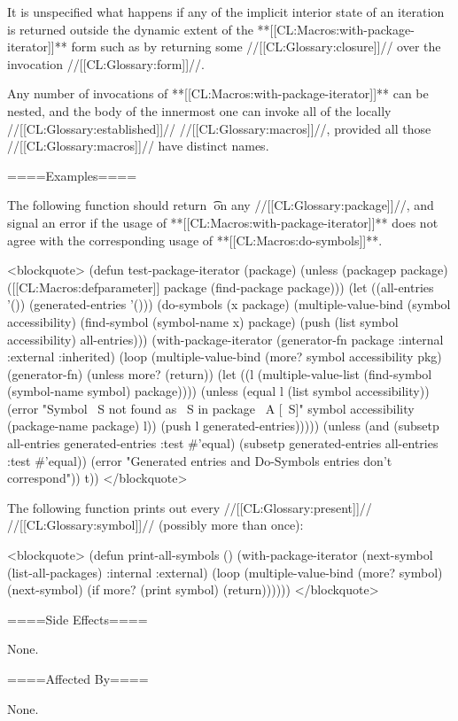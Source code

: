 It is unspecified what happens if any of the implicit interior state of an iteration is returned outside the dynamic extent of the **[[CL:Macros:with-package-iterator]]** form such as by returning some //[[CL:Glossary:closure]]// over the invocation //[[CL:Glossary:form]]//.

Any number of invocations of **[[CL:Macros:with-package-iterator]]** can be nested, and the body of the innermost one can invoke all of the locally //[[CL:Glossary:established]]// //[[CL:Glossary:macros]]//, provided all those //[[CL:Glossary:macros]]// have distinct names.

====Examples====

The following function should return \t\ on any //[[CL:Glossary:package]]//, and signal an error if the usage of **[[CL:Macros:with-package-iterator]]** does not agree with the corresponding usage of **[[CL:Macros:do-symbols]]**.

<blockquote> (defun test-package-iterator (package) (unless (packagep package) ([[CL:Macros:defparameter]] package (find-package package))) (let ((all-entries '()) (generated-entries '())) (do-symbols (x package) (multiple-value-bind (symbol accessibility) (find-symbol (symbol-name x) package) (push (list symbol accessibility) all-entries))) (with-package-iterator (generator-fn package :internal :external :inherited) (loop (multiple-value-bind (more? symbol accessibility pkg) (generator-fn) (unless more? (return)) (let ((l (multiple-value-list (find-symbol (symbol-name symbol) package)))) (unless (equal l (list symbol accessibility)) (error "Symbol ~S not found as ~S in package ~A [~S]" symbol accessibility (package-name package) l)) (push l generated-entries))))) (unless (and (subsetp all-entries generated-entries :test #'equal) (subsetp generated-entries all-entries :test #'equal)) (error "Generated entries and Do-Symbols entries don't correspond")) t)) </blockquote>

The following function prints out every //[[CL:Glossary:present]]// //[[CL:Glossary:symbol]]// (possibly more than once):

<blockquote> (defun print-all-symbols () (with-package-iterator (next-symbol (list-all-packages) :internal :external) (loop (multiple-value-bind (more? symbol) (next-symbol) (if more? (print symbol) (return)))))) </blockquote>

====Side Effects====

None.

====Affected By====

None.

